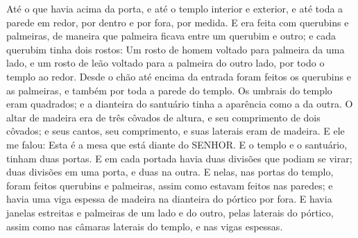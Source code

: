 {  Até o que havia acima da porta, e até o templo interior e exterior, e até toda a parede em redor, por dentro e por fora,
{} por medida.
  E era feita com querubins e palmeiras, de maneira que
{} palmeira ficava entre um querubim e outro; e cada querubim tinha dois rostos:
  Um rosto de homem voltado para palmeira da uma lado, e um rosto de leão voltado para a palmeira do outro lado,
{} por todo o templo ao redor.
  Desde o chão até encima da entrada foram feitos os querubins e as palmeiras, e também por toda a parede do templo.
  Os umbrais do templo eram quadrados; e a dianteira do santuário tinha a aparência como a da outra.
  O altar de madeira era de três côvados de altura, e seu comprimento de dois côvados; e seus cantos, seu comprimento, e suas laterais eram de madeira. E ele me falou: Esta é a mesa que está diante do SENHOR.
  E o templo e o santuário,
{} tinham duas portas.
  E em cada portada havia duas divisões que podiam se virar; duas divisões em uma porta, e duas na outra.
  E nelas, nas portas do templo, foram feitos querubins e palmeiras, assim como estavam feitos nas paredes; e havia uma viga espessa de madeira na dianteira do pórtico por fora.
  E havia janelas estreitas e palmeiras de um lado e do outro, pelas laterais do pórtico, assim como nas câmaras laterais do templo, e nas vigas espessas.
\par }

